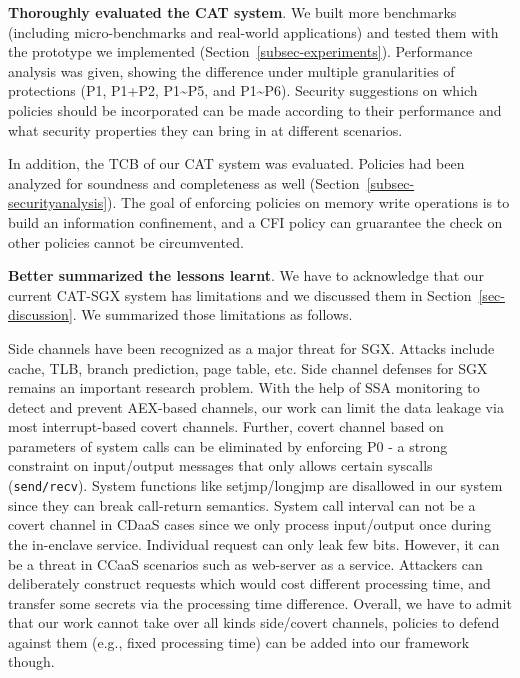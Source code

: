 \vspace{3pt}\noindent\textbf{Thoroughly evaluated the CAT system}.
We built more benchmarks (including micro-benchmarks and real-world applications) and tested them with the prototype we implemented (Section~\ref{subsec-experiments}). Performance analysis was given, showing the difference under multiple granularities of protections (P1, P1+P2, P1\textasciitilde P5, and P1\textasciitilde P6). Security suggestions on which policies should be incorporated can be made according to their performance and what security properties they can bring in at different scenarios.

In addition, the TCB of our CAT system was evaluated. Policies had been analyzed for soundness and completeness as well (Section~\ref{subsec-securityanalysis}). 
The goal of enforcing policies on memory write operations is to build an information confinement, and a CFI policy can gruarantee the check on other policies cannot be circumvented.


\vspace{3pt}\noindent\textbf{Better summarized the lessons learnt}.
We have to acknowledge that our current CAT-SGX system has limitations and we discussed them in Section~\ref{sec-discussion}. We summarized those limitations as follows.

Side channels have been recognized as a major threat for SGX. Attacks include cache, TLB, branch prediction, page table, etc. Side channel defenses for SGX remains an important research problem. 
With the help of SSA monitoring to detect and prevent AEX-based channels, our work can limit the data leakage via most interrupt-based covert channels. Further, covert channel based on parameters of system calls can be eliminated by enforcing P0 - a strong constraint on input/output messages that only allows certain syscalls (\texttt{send/recv}). System functions like setjmp/longjmp are disallowed in our system since they can break
call-return semantics.
System call interval can not be a covert channel in CDaaS cases since we only process input/output once during the in-enclave service. Individual request can only leak few bits. However, it can be a threat in CCaaS scenarios such as web-server as a service. Attackers can deliberately construct requests which would cost different processing time, and transfer some secrets via the processing time difference. Overall, we have to admit that our work cannot take over all kinds side/covert channels, policies to defend against them (e.g., fixed processing time) can be added into our framework though.

